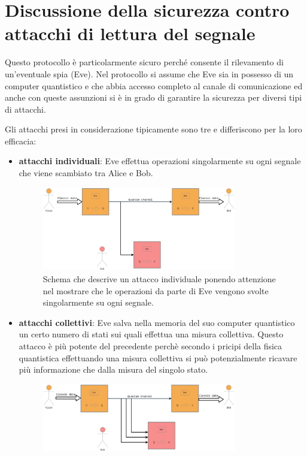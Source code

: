 \section{Discussione della sicurezza contro attacchi di lettura del segnale}
Questo protocollo \`e particolarmente sicuro perch\'e consente il rilevamento di un'eventuale spia (Eve). Nel protocollo si assume che Eve sia in possesso di un computer quantistico e che abbia accesso completo al canale di comunicazione ed anche con queste assunzioni si \`e in grado di garantire la sicurezza per diversi tipi di attacchi.

Gli attacchi presi in considerazione tipicamente sono tre e differiscono per la loro efficacia:
\begin{itemize}
\item \textbf{attacchi individuali}: Eve effettua operazioni singolarmente su ogni segnale che viene scambiato tra Alice e Bob. 
\begin{figure}[H] 
\begin{center}
\includegraphics[width=0.8\textwidth]{figure/individual_attack.eps} 
\end{center}
\caption[Schema attacco individuale]{Schema che descrive un attacco individuale ponendo attenzione nel mostrare che le operazioni da parte di Eve vengono svolte singolarmente su ogni segnale.} \label{fig:attacco-individuale}
\end{figure}
\item \textbf{attacchi collettivi}: Eve salva nella memoria del suo computer quantistico un certo numero di stati sui quali effettua una misura collettiva. Questo attacco \`e pi\`u potente del precedente perch\`e secondo i pricipi della fisica quantistica effettuando una misura collettiva si pu\`o potenzialmente ricavare pi\`u informazione che dalla misura del singolo stato.
\begin{figure}[H] 
\begin{center}
\includegraphics[width=0.8\textwidth]{figure/collective_attack.eps} 

\end{center}
\end{figure}
\end{itemize}
